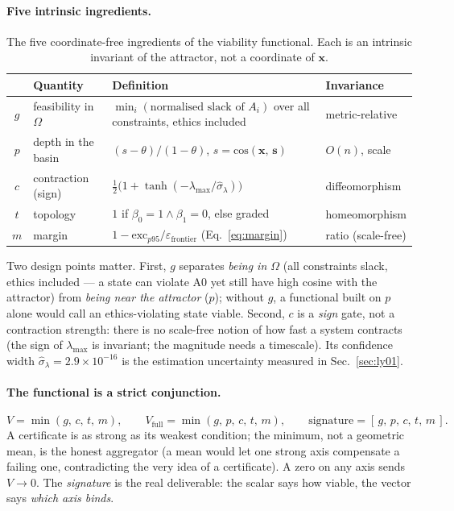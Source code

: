 \documentclass[11pt, a4paper]{article}
\newcommand{\stasis}{\bm{s}}
\newcommand{\sv}{\bm{x}}
\newcommand{\cosim}[2]{\mathrm{cos}\!\left(#1,\, #2\right)}
\begin{document}
\paragraph{Five intrinsic ingredients.}
\begin{table}[!htb]
\centering
\small
\begin{tabular}{cp{4.2cm}p{4.0cm}p{2.6cm}}
\toprule
 & Quantity & Definition & Invariance \\
\midrule
$g$ & feasibility in $\Omega$ & $\min_i(\text{normalised slack of } A_i)$ over all constraints, ethics included & metric-relative \\
$p$ & depth in the basin & $(s - \theta)/(1-\theta)$, $s = \cosim{\sv}{\stasis}$ & $O(n)$, scale \\
$c$ & contraction (sign) & $\tfrac12\bigl(1 + \tanh(-\lambda_\text{max}/\hat\sigma_\lambda)\bigr)$ & diffeomorphism \\
$t$ & topology & $1$ if $\beta_0=1 \wedge \beta_1=0$, else graded & homeomorphism \\
$m$ & margin & $1 - \mathrm{exc}_{p95}/\varepsilon_\text{frontier}$ (Eq.~\eqref{eq:margin}) & ratio (scale-free) \\
\bottomrule
\end{tabular}
\caption{The five coordinate-free ingredients of the viability functional. Each
is an intrinsic invariant of the attractor, not a coordinate of $\sv$.}
\label{tab:v_ingredients}
\end{table}

Two design points matter. First, $g$ separates \emph{being in $\Omega$} (all
constraints slack, ethics included --- a state can violate A0 yet still have high
cosine with the attractor) from \emph{being near the attractor} ($p$); without
$g$, a functional built on $p$ alone would call an ethics-violating state viable.
Second, $c$ is a \emph{sign} gate, not a contraction strength: there is no
scale-free notion of how fast a system contracts (the sign of $\lambda_\text{max}$
is invariant; the magnitude needs a timescale). Its confidence width
$\hat\sigma_\lambda = 2.9\times 10^{-16}$ is the estimation uncertainty measured
in Sec.~\ref{sec:ly01}.

\paragraph{The functional is a strict conjunction.}
\begin{equation}
  V = \min(g,\,c,\,t,\,m),
  \qquad
  V_\text{full} = \min(g,\,p,\,c,\,t,\,m),
  \qquad
  \text{signature} = [\,g,\,p,\,c,\,t,\,m\,].
  \label{eq:v}
\end{equation}
A certificate is as strong as its weakest condition; the minimum, not a
geometric mean, is the honest aggregator (a mean would let one strong axis
compensate a failing one, contradicting the very idea of a certificate). A zero
on any axis sends $V \to 0$. The \emph{signature} is the real deliverable: the
scalar says how viable, the vector says \emph{which axis binds}.
\end{document}
